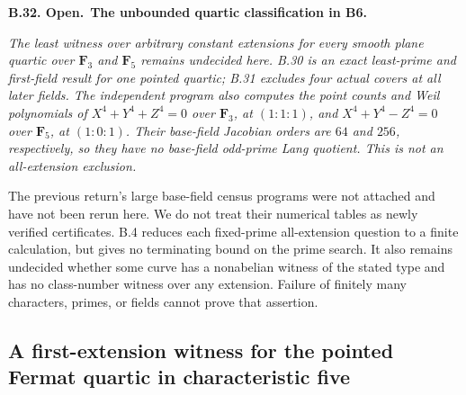 \documentclass[11pt,a4paper]{article}
\newenvironment{claim}[3]{\par\medskip\noindent\hypertarget{#1}{\textbf{#1. #2.}}\ \textbf{#3.}\par\nopagebreak\smallskip\begingroup\itshape}{\endgroup\par\smallskip}
\begin{document}
\begin{claim}{B.32}{Open}{The unbounded quartic classification in B6}
The least witness over arbitrary constant extensions for
\emph{every} smooth plane quartic over $\mathbf F_3$ and
$\mathbf F_5$ remains undecided here. B.30 is an exact
least-prime and first-field result for one pointed quartic;
B.31 excludes four actual covers at all later fields.
The independent program 
also computes the point counts and Weil polynomials of
$X^4+Y^4+Z^4=0$ over $\mathbf F_3$, at $(1:1:1)$,
and $X^4+Y^4-Z^4=0$ over $\mathbf F_5$, at $(1:0:1)$.
Their base-field Jacobian orders are $64$ and $256$,
respectively, so they have no base-field odd-prime Lang
quotient. This is not an all-extension exclusion.

The previous return's large base-field census programs were
not attached and have not been rerun here. We do not treat
their numerical tables as newly verified certificates.
B.4 reduces each fixed-prime all-extension question to a
finite calculation, but gives no terminating bound on the
prime search. It also remains undecided whether some curve
has a nonabelian witness of the stated type and has no
class-number witness over any extension. Failure of finitely
many characters, primes, or fields cannot prove that assertion.
\end{claim}


\subsection{A first-extension witness for the pointed Fermat quartic in characteristic five}
\end{document}
